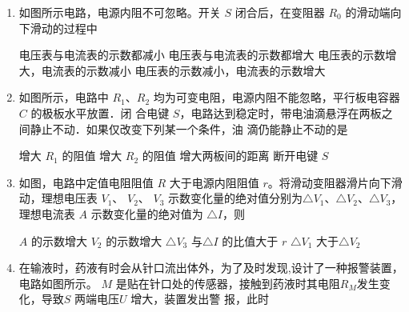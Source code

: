 
\begin{enumerate}
\item
{}
如图所示电路，电源内阻不可忽略。开关 $ S $ 闭合后，在变阻器 $ R_{0} $ 的滑动端向下滑动的过程中  
\begin{figure}[h!]
\centering

\end{figure}

\fourchoices
{电压表与电流表的示数都减小}
{电压表与电流表的示数都增大}
{电压表的示数增大，电流表的示数减小}
{电压表的示数减小，电流表的示数增大}


\item 
{}
如图所示，电路中 $ R_{1} $、$ R_{2} $ 均为可变电阻，电源内阻不能忽略，平行板电容器 $ C $ 的极板水平放置．闭
合电键 $ S $，电路达到稳定时，带电油滴悬浮在两板之间静止不动．如果仅改变下列某一个条件，油
滴仍能静止不动的是  
\begin{figure}[h!]
\centering

\end{figure}

\fourchoices
{增大 $ R_{1} $ 的阻值}
{增大 $ R_{2} $ 的阻值}
{增大两板间的距离}
{断开电键 $ S $}


\item 
{}
如图，电路中定值电阻阻值 $ R $ 大于电源内阻阻值 $ r $。将滑动变阻器滑片向下滑动，理想电压表
$ V_{1} $、 $ V_{2} $、 $ V_{3} $ 示数变化量的绝对值分别为$ \triangle V_{1} $、$ \triangle V_{2} $、$ \triangle V_{3} $，理想电流表 $ A $ 示数变化量的绝对值为
$ \triangle I $，则  
\begin{figure}[h!]
\centering

\end{figure}

\fourchoices
{$ A $ 的示数增大}
{$ V_{2} $ 的示数增大}
{$ \triangle V_{3} $ 与$ \triangle I $ 的比值大于 $ r $}
{$ \triangle V_{1} $ 大于$ \triangle V_{2} $}


\item 
{}
在输液时，药液有时会从针口流出体外，为了及时发现,设计了一种报警装置，电路如图所示。 $ M $
是贴在针口处的传感器，接触到药液时其电阻$ R_M $发生变化，导致$ S $ 两端电压$ U $ 增大，装置发出警
报，此时  
\begin{figure}[h!]
\centering

\end{figure}


\end{enumerate}

